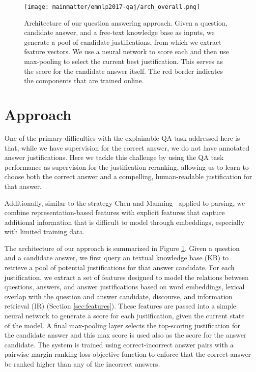 
\begin{figure}[t]
\begin{center}
\texttt{[image: mainmatter/emnlp2017-qaj/arch\_overall.png]}
\caption{ Architecture of our question answering approach.  
Given a question, candidate answer, and a free-text knowledge base as inputs, we generate a pool of candidate justifications, from which we extract feature vectors.  We use a neural network to score each and then use max-pooling to select the current best justification. This serves as the score for the candidate answer itself.  The red border indicates the components that are trained online. }
\label{fig:arch_overall}
\vspace{-5mm}
\end{center}
\end{figure}

\section{Approach}
\label{sec:approach}
One of the primary difficulties with the explainable QA task addressed here is that, while we have supervision for the correct answer, we do not have annotated answer justifications.  
Here we tackle this challenge by using the QA task performance as supervision for the justification reranking, allowing us to 
learn to choose both the correct answer and a compelling, human-readable justification for that answer.

Additionally, similar to the strategy Chen and Manning~\citeyear{chen2014fast} applied to parsing, we combine representation-based features with explicit features that capture additional information that is difficult to model through embeddings, especially with limited training data.



The architecture of our approach is summarized in Figure \ref{fig:arch_overall}.  
Given a question and a candidate answer, we first query an textual knowledge base (KB) to retrieve a pool of potential justifications for that answer candidate.  
For each justification, we extract a set of features designed to model the relations between questions, answers, and answer justifications based on word embeddings, lexical overlap with the question and answer candidate, discourse, and information retrieval (IR) (Section \ref{sec:features}).
These features are passed into a simple neural network to generate a score for each justification, given the current state of the model.  A final max-pooling layer selects the top-scoring justification for the candidate answer and this max score is used also as the score for the answer candidate.  
The system is trained using correct-incorrect answer pairs with a pairwise margin ranking loss objective function to enforce that the correct answer be ranked higher than any of the incorrect answers. 

